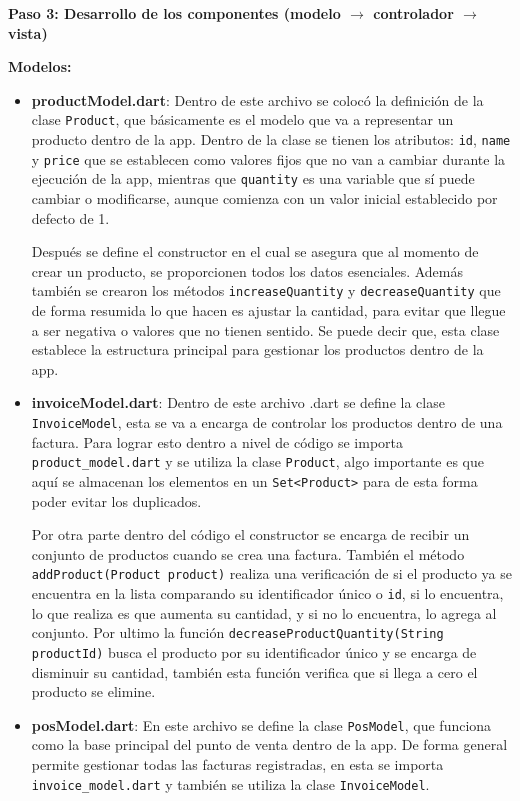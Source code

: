 \textbf{Paso 3: Desarrollo de los componentes (modelo $\rightarrow$ controlador $\rightarrow$ vista)}  

\textbf{Modelos:}  
\begin{itemize}
    \item \textbf{productModel.dart}: Dentro de este archivo se colocó la definición de la clase \texttt{Product}, que básicamente es el modelo que va a representar un producto dentro de la app. Dentro de la clase se tienen los atributos: \texttt{id}, \texttt{name} y \texttt{price} que se establecen como valores fijos que no van a cambiar durante la ejecución de la app, mientras que \texttt{quantity} es una variable que sí puede cambiar o modificarse, aunque comienza con un valor inicial establecido por defecto de 1.

    Después se define el constructor en el cual se asegura que al momento de crear un producto, se proporcionen todos los datos esenciales. Además también se crearon los métodos \texttt{increaseQuantity} y \texttt{decreaseQuantity} que de forma resumida lo que hacen es ajustar la cantidad, para evitar que llegue a ser negativa o valores que no tienen sentido. Se puede decir que, esta clase establece la estructura principal para gestionar los productos dentro de la app.
    
    \item \textbf{invoiceModel.dart}: Dentro de este archivo .dart se define la clase \texttt{InvoiceModel}, esta se va a encarga de controlar los productos dentro de una factura. Para lograr esto dentro a nivel de código se importa \texttt{product\_model.dart} y se utiliza la clase \texttt{Product}, algo importante es que aquí se almacenan los elementos en un \texttt{Set<Product>} para de esta forma poder evitar los duplicados.

    Por otra parte dentro del código el constructor se encarga de recibir un conjunto de productos cuando se crea una factura. También el método \texttt{addProduct(Product product)} realiza una verificación de si el producto ya se encuentra en la lista comparando su identificador único o \texttt{id}, si lo encuentra, lo que realiza es que aumenta su cantidad, y si no lo encuentra, lo agrega al conjunto. Por ultimo la función \texttt{decreaseProductQuantity(String productId)} busca el producto por su identificador único y se encarga de disminuir su cantidad, también esta función verifica que si llega a cero el producto se elimine.
    
    \item \textbf{posModel.dart}: En este archivo se define la clase \texttt{PosModel}, que funciona como la base principal del punto de venta dentro de la app. De forma general permite gestionar todas las facturas registradas, en esta se importa \texttt{invoice\_model.dart} y también se utiliza la clase \texttt{InvoiceModel}.


\end{itemize}
